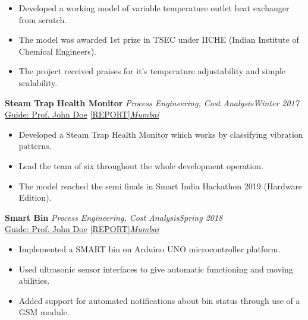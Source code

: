 \documentclass[10pt]{article}
\begin{document}
\begin{itemize}[itemsep = -0.75 mm, leftmargin=*]
    \item Developed a working model of variable temperature outlet heat exchanger from scratch.
    \item The model was awarded 1st prize in TSEC under IICHE (Indian Institute of Chemical Engineers).
    \item The project received praises for it's temperature adjustability and simple scalability.
\end{itemize}
\textbf{\large Steam Trap Health Monitor} \textemdash \textit{Process Engineering, Cost Analysis}\hfill{\sl \small Winter 2017}\\
 \href{https://johndoe.com}{Guide: Prof. John Doe}\hspace{10pt} \href{https://www.github.com/aovi14/process_sim}{[REPORT]}\hfill{\sl \small \href{https://www.mumbai.com}{Mumbai}}\\\vspace{-15pt}
\begin{itemize}[itemsep = -0.75 mm, leftmargin=*]
    \item Developed a Steam Trap Health Monitor which works by classifying vibration patterns.
    \item Lead the team of six throughout the whole development operation.
    \item The model reached the semi finals in Smart India Hackathon 2019 (Hardware Edition).
\end{itemize}
\textbf{\large Smart Bin} \textemdash \textit{Process Engineering, Cost Analysis}\hfill{\sl \small Spring 2018}\\
 \href{https://johndoe.com}{Guide: Prof. John Doe}\hspace{10pt} \href{https://www.github.com/aovi14/process_sim}{[REPORT]}\hfill{\sl \small \href{https://www.mumbai.com}{Mumbai}}\\\vspace{-15pt}
\begin{itemize}[itemsep = -0.75 mm, leftmargin=*]
    \item Implemented a SMART bin on Arduino UNO microcontroller platform.
    \item Used ultrasonic sensor interfaces to give automatic functioning and moving abilities.
    \item Added support for automated notifications about bin status through use of a GSM module.
\end{itemize}
\vspace*{-3pt}
\end{document}
